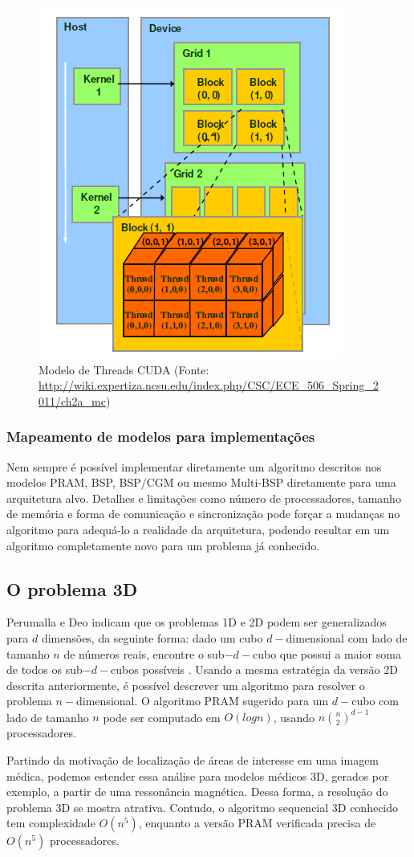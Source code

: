 \documentclass[a4paper, 12pt] {article}
\begin{document}
\begin{figure}[ht]
\centering
\includegraphics[width=.4\textwidth]{Cuda_execution.png}
\caption{Modelo de Threads CUDA (Fonte:
\url{http://wiki.expertiza.ncsu.edu/index.php/CSC/ECE_506_Spring_2011/ch2a_mc}) }
\label{fig:cuda-execution}
\end{figure}


\subsubsection{Mapeamento de modelos para implementações}

Nem sempre é possível implementar diretamente um algoritmo descritos nos modelos
PRAM, BSP, BSP/CGM ou mesmo Multi-BSP diretamente para uma arquitetura alvo.
Detalhes e limitações como número de processadores, tamanho de memória e forma
de comunicação e sincronização pode forçar a mudanças no algoritmo para
adequá-lo a realidade da arquitetura, podendo resultar em um algoritmo
completamente novo para um problema já conhecido.

\subsection{O problema 3D}

Perumalla e Deo indicam que os problemas 1D e 2D
podem ser generalizados para $d$ dimensões, da seguinte forma: dado um cubo $d-$dimensional com lado de tamanho $n$ de números reais,
encontre o sub$-d-$cubo que possui a maior soma de todos os sub$-d-$cubos
possíveis \cite{journals/ppl/PerumallaD95}. Usando a mesma estratégia da versão
2D descrita anteriormente, é possível descrever um algoritmo para resolver o problema $n-$dimensional. O
algoritmo PRAM sugerido para um $d-$cubo com lado de tamanho $n$ pode ser
computado em $O(log n)$, usando $n\binom{n}{2}^{d-1}$ processadores.

Partindo da motivação de localização de áreas de interesse em uma imagem médica,
podemos estender essa análise para modelos médicos 3D, gerados por exemplo, a
partir de uma ressonância magnética. Dessa forma, a resolução do problema 3D se
mostra atrativa. Contudo, o algoritmo sequencial 3D conhecido tem complexidade
$O(n^5)$, enquanto a versão PRAM verificada precisa de $O(n^5)$ processadores.
\end{document}
